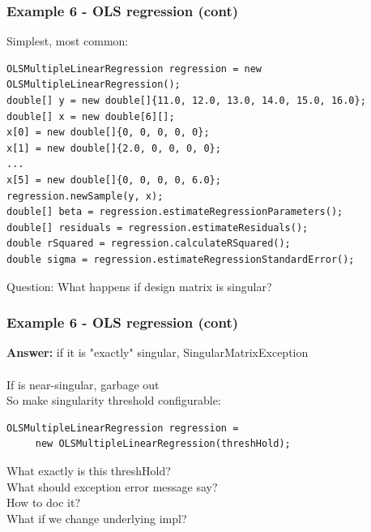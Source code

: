 \documentclass[14pt,mathserif]{beamer}
\begin{document}
\begin{frame}[fragile]
  \frametitle{Example 6 - OLS regression (cont)}

\begin{small}
Simplest, most common:
\begin{verbatim}
OLSMultipleLinearRegression regression = new OLSMultipleLinearRegression();
double[] y = new double[]{11.0, 12.0, 13.0, 14.0, 15.0, 16.0};
double[] x = new double[6][];
x[0] = new double[]{0, 0, 0, 0, 0};
x[1] = new double[]{2.0, 0, 0, 0, 0};
...
x[5] = new double[]{0, 0, 0, 0, 6.0};          
regression.newSample(y, x);
double[] beta = regression.estimateRegressionParameters();       
double[] residuals = regression.estimateResiduals();
double rSquared = regression.calculateRSquared();
double sigma = regression.estimateRegressionStandardError();
\end{verbatim}
\end{small}
Question:  What happens if design matrix is singular?
\end{frame}

\begin{frame}[fragile]
  \frametitle{Example 6 - OLS regression (cont)}

\begin{small}
\textbf{Answer:} if it is "exactly" singular, SingularMatrixException \\~\\
If is near-singular, garbage out \\
So make singularity threshold configurable:
\begin{verbatim}
OLSMultipleLinearRegression regression =
     new OLSMultipleLinearRegression(threshHold);
\end{verbatim}
What exactly is this threshHold? \\
What should exception error message say? \\
How to doc it? \\
What if we change underlying impl?
\end{small}
\end{frame}
\end{document}
